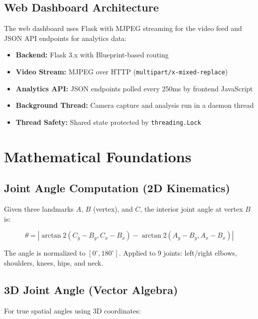 \documentclass[a4paper,12pt]{report}
\begin{document}
\section{Web Dashboard Architecture}
The web dashboard uses Flask with MJPEG streaming for the video feed and JSON API endpoints for analytics data:

\begin{itemize}
    \item \textbf{Backend:} Flask 3.x with Blueprint-based routing
    \item \textbf{Video Stream:} MJPEG over HTTP (\texttt{multipart/x-mixed-replace})
    \item \textbf{Analytics API:} JSON endpoints polled every 250ms by frontend JavaScript
    \item \textbf{Background Thread:} Camera capture and analysis run in a daemon thread
    \item \textbf{Thread Safety:} Shared state protected by \texttt{threading.Lock}
\end{itemize}

\newpage

\chapter{Mathematical Foundations}
\thispagestyle{contentpages}
\justifying

\section{Joint Angle Computation (2D Kinematics)}
Given three landmarks $A$, $B$ (vertex), and $C$, the interior joint angle at vertex $B$ is:

\begin{equation}
    \theta = \left| \arctan2(C_y - B_y, C_x - B_x) - \arctan2(A_y - B_y, A_x - B_x) \right|
    \label{eq:angle2d}
\end{equation}

The angle is normalized to $[0^{\circ}, 180^{\circ}]$. Applied to 9 joints: left/right elbows, shoulders, knees, hips, and neck.

\section{3D Joint Angle (Vector Algebra)}
For true spatial angles using 3D coordinates:
\end{document}
